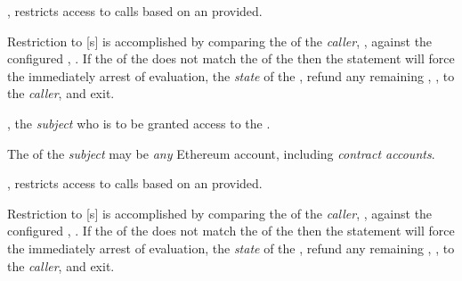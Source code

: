 \begin{code}
  \begin{modifiers}
    \item {}, restricts access to  calls
      based on an  provided.

      \begin{displayquote}
        Restriction to [s] is accomplished by comparing the
         of the  \emph{caller}, ,
        against the configured , . If the
         of the  does not match the
         of the  then the  statement
        will force the immediately arrest of  evaluation,
         the \emph{state} of the , refund any
        remaining , , to the \emph{caller}, and
        exit.\footnotemark{}

      \end{displayquote}


      \begin{parameters}
      \item {}, the \emph{subject} who is to be granted
        access to the .

        \begin{displayquote}
          The  of the \emph{subject} may be \emph{any} Ethereum
          account, including \emph{contract accounts}.
        \end{displayquote}
      \end{parameters}

    \item {}, restricts access to
       calls based on an  provided.

      \begin{displayquote}
        Restriction to [s] is accomplished by comparing the
         of the  \emph{caller}, ,
        against the configured , . If the
         of the  does not match the
         of the  then the  statement
        will force the immediately arrest of  evaluation,
         the \emph{state} of the , refund any
        remaining , , to the \emph{caller}, and
        exit.\footnotemark{}


\end{displayquote}
\end{modifiers}
\end{code}
